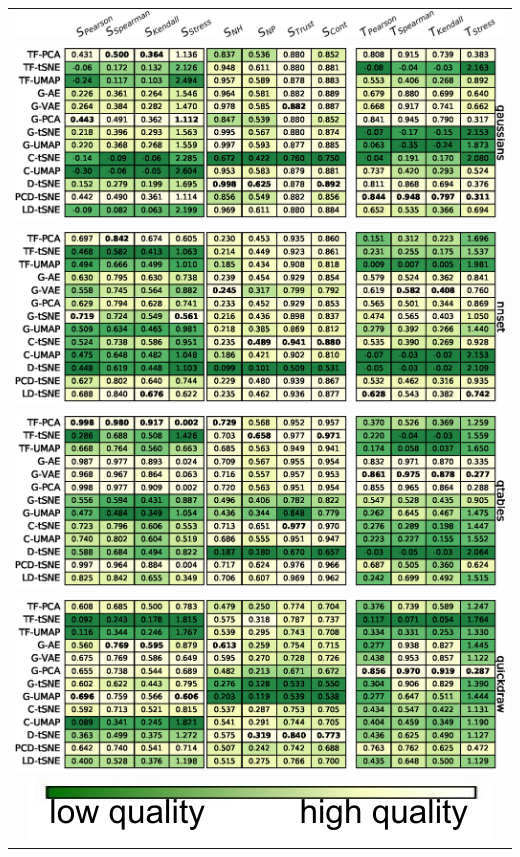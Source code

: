 \begin{table}[h]
\begin{tabular}{c}
    \vspace{-.1cm}
    \includegraphics[width=\linewidth]{figures/projection-algorithm/table_header.png} \\
    \includegraphics[width=\linewidth]{figures/projection-algorithm/table_gaussians.eps} \\
    \includegraphics[width=\linewidth]{figures/projection-algorithm/table_nnset.eps} \\
    \includegraphics[width=\linewidth]{figures/projection-algorithm/table_qtables.eps} \\
    \includegraphics[width=\linewidth]{figures/projection-algorithm/table_quickdraw.eps} \\
    \includegraphics[width=.35\linewidth]{figures/projection-algorithm/green-colormap.pdf} \\
\end{tabular}
\end{table}
    

